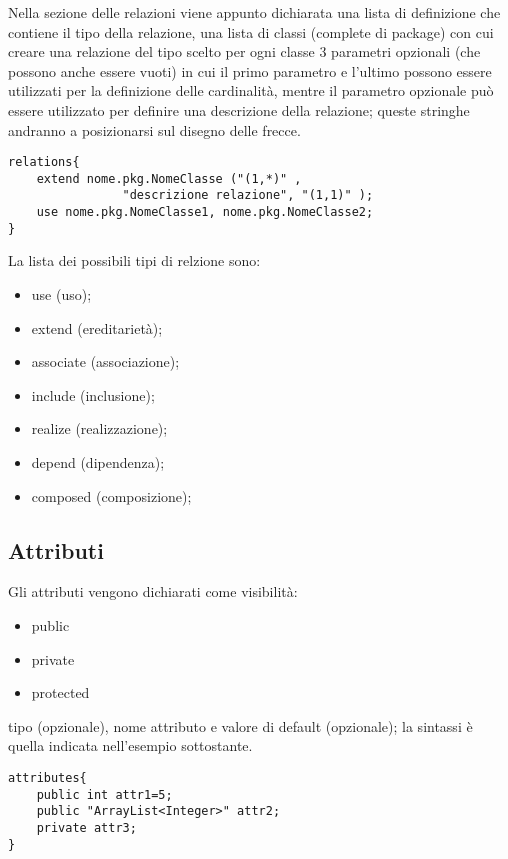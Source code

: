 Nella sezione delle relazioni
viene appunto dichiarata una lista di definizione che contiene il tipo della 
relazione, una lista di classi (complete di package) 
con cui creare una relazione del tipo scelto
per ogni classe 3 parametri opzionali (che possono anche essere vuoti) in cui
il primo parametro e l'ultimo possono essere utilizzati per la definizione delle
cardinalità, mentre il parametro opzionale può essere utilizzato per definire
una descrizione della relazione; queste stringhe andranno a posizionarsi sul 
disegno delle frecce.

\begin{lstlisting}[caption={Dichiarazione di relazione}, style={model}]
relations{
	extend nome.pkg.NomeClasse ("(1,*)" , 
				"descrizione relazione", "(1,1)" );
	use nome.pkg.NomeClasse1, nome.pkg.NomeClasse2;
}
\end{lstlisting}

La lista dei possibili tipi di relzione sono:
\begin{itemize}
  \item{use (uso);}
  \item{extend (ereditarietà);}
  \item{associate (associazione);}
  \item{include (inclusione);}
  \item{realize (realizzazione);}
  \item{depend (dipendenza);}
  \item{composed (composizione);}
\end{itemize}

\subsection{Attributi}

Gli attributi vengono dichiarati come visibilità:
\begin{itemize}
  \item public
  \item private
  \item protected
\end{itemize}

tipo (opzionale), nome attributo e valore di default (opzionale); la sintassi è
quella indicata nell'esempio sottostante.

\begin{lstlisting}[caption={Dichiarazione di attributi}, style={model}]
attributes{
	public int attr1=5;
	public "ArrayList<Integer>" attr2;
	private attr3;
}
\end{lstlisting}

